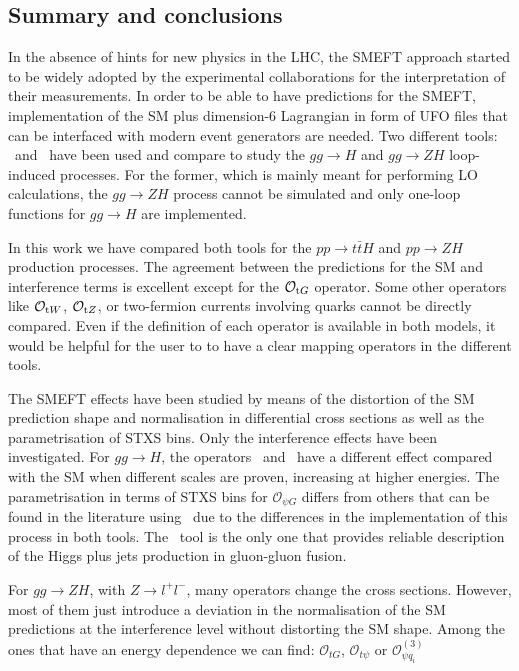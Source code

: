 \subsection{Summary and conclusions}
In the absence of hints for new physics in the LHC, the SMEFT approach started to be widely adopted by the experimental collaborations for the interpretation of their measurements. In order to be able to have predictions for the SMEFT, implementation of the SM plus dimension-6 Lagrangian in form of UFO files that can be interfaced with modern event generators are needed. Two different tools: \SMEFTsim\ and \SMEFTatNLO\ have been used and compare to study the $gg\to H$ and $gg\to ZH$ loop-induced processes. For the former, which is mainly meant for performing LO calculations, the $gg\to ZH$ process cannot be simulated and only one-loop functions for $gg\to H$ are implemented.

In this work we have compared both tools for the $pp\to t\bar{t}H$ and $pp\to ZH$ production processes. The agreement between the predictions for the SM and interference terms is excellent except for the $\mathcal{O}_{\textrm tG}$ operator. Some other operators like $\mathcal{O}_{\textrm tW}$, $\mathcal{O}_{\textrm tZ}$, or two-fermion currents involving quarks cannot be directly compared. Even if the definition of each operator is available in both models, it would be helpful for the user to to have a clear mapping operators in the different tools.

The SMEFT effects have been studied by means of the distortion of the SM prediction shape and normalisation in differential cross sections as well as the parametrisation of STXS bins. Only the interference effects have been investigated. For $gg\to H$, the operators \cpG\ and \ctG\ have a different effect compared with the SM when different scales are proven, increasing at higher energies.
The parametrisation in terms of STXS bins for $\mathcal{O}_{\psi G}$ differs from others that can be found in the literature using \SMEFTsim\ due to the differences in the implementation of this process in both tools. The \SMEFTatNLO\ tool is the only one that provides reliable description of the Higgs plus jets production in gluon-gluon fusion.

For $gg\to ZH$, with $Z\to l^{+}l^{-}$,  many operators change the cross sections. However, most of them just introduce a deviation in the normalisation of the SM predictions at the interference level without distorting the SM shape. Among the ones that have an energy dependence we can find: $\mathcal{O}_{tG}$, $\mathcal{O}_{t\psi}$ or $\mathcal{O}_{\psi q_i}^{(3)}$ 

